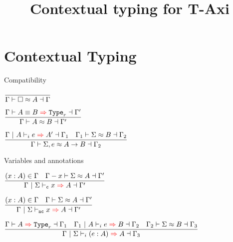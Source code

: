 \documentclass{beamer}
\title{Contextual typing for T-Axi}
\begin{document}
\section{Contextual Typing}



\NewDocumentCommand{\emptyhint}{}{\square}

\begin{frame}{Compatibility}

\begin{center}
  $\infrule{}{\compat{\Gamma}{\emptyhint}{A}{\Gamma}}$

  \vspace{2em}

  $\infrule{\infertypeconv{\Gamma}{A}{B}[r]{\Gamma'}}{\compat{\Gamma}{\typehint{A}}{B}{\Gamma'}}$

  \vspace{2em}

  $\infrule{\infer{\Gamma}{A}{e}{A'}{\Gamma_1} \quad \compat{\Gamma_1}{\Sigma}{B}{\Gamma_2}}{\compat{\Gamma}{\arghint{\Sigma}{e}}{\Fun{A}{B}}{\Gamma_2}}$
\end{center}

\end{frame}

\begin{frame}{Variables and annotations}

\begin{center}
  $\infrule{(x : A) \in \Gamma \quad \compat{\usevar{\Gamma}{x}}{\Sigma}{A}{\Gamma'}}{\infer{\Gamma}{\Sigma}[\computable]{x}{A}{\Gamma'}}$

  \vspace{2em}

  $\infrule{(x : A) \in \Gamma \quad \compat{\Gamma}{\Sigma}{A}{\Gamma'}}{\infer{\Gamma}{\Sigma}[\noncomputable]{x}{A}{\Gamma'}}$

  \vspace{2em}

  $\infrule{\inferkind{\Gamma}{A}[r]{\Gamma_1} \quad \infer{\Gamma_1}{A}{e}{B}{\Gamma_2} \quad \compat{\Gamma_2}{\Sigma}{B}{\Gamma_3}}{\infer{\Gamma}{\Sigma}{\annot{e}{A}}{A}{\Gamma_3}}$
\end{center}

\end{frame}
\end{document}

